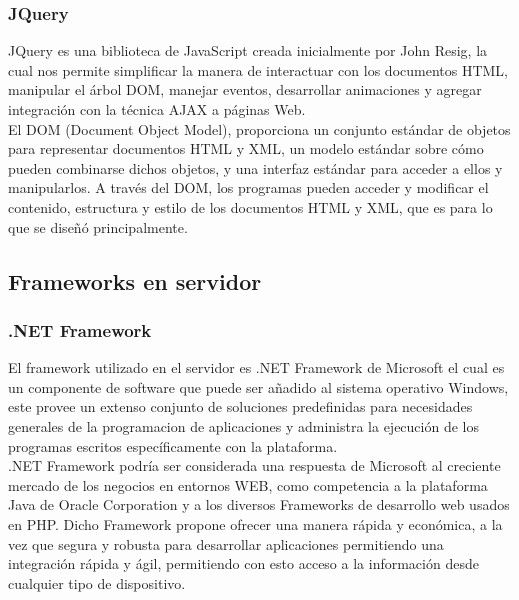 	\subsubsection{JQuery}

		JQuery es una biblioteca de JavaScript creada inicialmente por John Resig, la cual nos permite simplificar la manera de interactuar con los documentos HTML, manipular el \'arbol DOM, manejar eventos, desarrollar animaciones y agregar integraci\'on con la t\'ecnica AJAX a p\'aginas Web.\\

		El DOM (Document Object Model), proporciona un conjunto est\'andar de objetos para representar documentos HTML y XML, un modelo est\'andar sobre c\'omo pueden combinarse dichos objetos, y una interfaz est\'andar para acceder a ellos y manipularlos. A trav\'es del DOM, los programas pueden acceder y modificar el contenido, estructura y estilo de los documentos HTML y  XML, que es para lo que se dise\~n\'o principalmente.\\

\subsection{Frameworks en servidor}

	\subsubsection{.NET Framework}

		El framework utilizado en el servidor es .NET Framework de Microsoft el cual es un componente de software que puede ser a\~nadido al sistema operativo Windows, este provee un extenso conjunto de soluciones predefinidas para necesidades generales de la programacion de aplicaciones y administra la ejecuci\'on de los programas escritos espec\'ificamente con la plataforma.\\

		.NET Framework podr\'ia ser considerada una respuesta de Microsoft al creciente mercado de los negocios en entornos WEB, como competencia a la plataforma Java de Oracle Corporation y a los diversos Frameworks de desarrollo web usados en PHP. Dicho Framework propone ofrecer una manera r\'apida y econ\'omica, a la vez que segura y robusta para desarrollar aplicaciones permitiendo una integraci\'on r\'apida y \'agil, permitiendo con esto acceso a la informaci\'on desde cualquier tipo de dispositivo.\\

